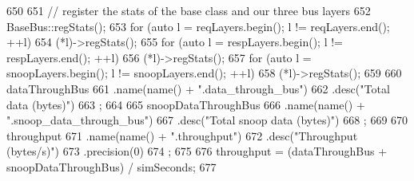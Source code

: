 \begin{DoxyCode}
650 {
651     // register the stats of the base class and our three bus layers
652     BaseBus::regStats();
653     for (auto l = reqLayers.begin(); l != reqLayers.end(); ++l)
654         (*l)->regStats();
655     for (auto l = respLayers.begin(); l != respLayers.end(); ++l)
656         (*l)->regStats();
657     for (auto l = snoopLayers.begin(); l != snoopLayers.end(); ++l)
658         (*l)->regStats();
659 
660     dataThroughBus
661         .name(name() + ".data_through_bus")
662         .desc("Total data (bytes)")
663         ;
664 
665     snoopDataThroughBus
666         .name(name() + ".snoop_data_through_bus")
667         .desc("Total snoop data (bytes)")
668     ;
669 
670     throughput
671         .name(name() + ".throughput")
672         .desc("Throughput (bytes/s)")
673         .precision(0)
674         ;
675 
676     throughput = (dataThroughBus + snoopDataThroughBus) / simSeconds;
677 }
\end{DoxyCode}


